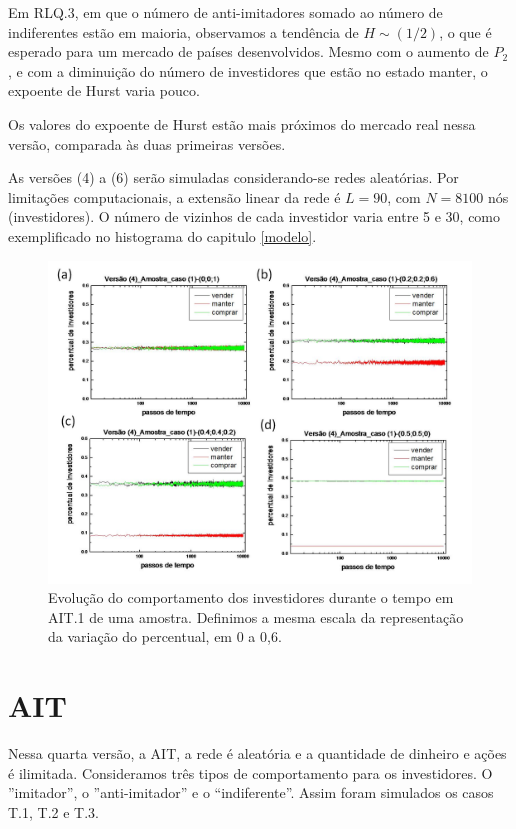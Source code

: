 \documentclass[brazil,ruledheader]{abnt}
\begin{document}
Em RLQ.3, em que o número de anti-imitadores somado ao número de indiferentes
estão em maioria, observamos a tendência de $H\sim (1/2)$, o que é esperado para
um
mercado de países desenvolvidos. Mesmo com o aumento de $P_2$, e com a
diminuição do número de investidores que estão no estado manter, o expoente de
Hurst varia pouco.

Os valores do expoente de Hurst estão mais próximos do mercado real nessa
versão, comparada às duas primeiras versões. 

As versões (4) a (6) serão simuladas considerando-se redes aleatórias. Por
limitações computacionais, a extensão linear da rede é $L=90$, com $N=8100$ nós
(investidores). O número de vizinhos de cada investidor varia entre 5 e
30, como exemplificado no histograma do capitulo \ref{modelo}.

\begin{figure}[!h]
\centering
\includegraphics[width=.7\linewidth]{Figuras/26.jpg}
\caption[Evolução do comportamento dos investidores em AIT.1] {Evolução do
comportamento dos investidores durante o tempo em AIT.1 de uma amostra.
Definimos a mesma escala da representação da
variação do percentual, em 0 a 0,6. }
\label{fig:evolucao-comp-investidores6}
\end{figure}

\section{AIT}

Nessa quarta versão, a AIT, a rede é aleatória e a quantidade de dinheiro e
ações é ilimitada. Consideramos três tipos de comportamento para os
investidores.
O ''imitador'', o ''anti-imitador'' e o “indiferente”. Assim foram simulados os
casos  T.1, T.2 e T.3. 
\end{document}
